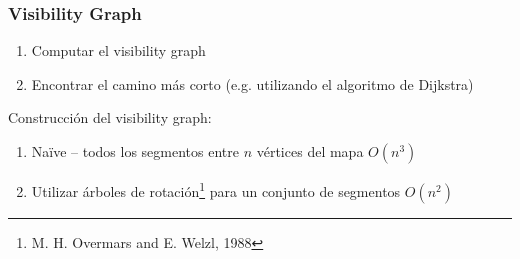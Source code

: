 \begin{frame}
	\frametitle{Visibility Graph}
	
	\begin{enumerate}
		\item Computar el visibility graph
		\item Encontrar el camino más corto (e.g. utilizando el algoritmo de Dijkstra)
	\end{enumerate}
	
	\begin{figure}
		\hspace{1em}
		\hspace{1em}
	\end{figure}

	Construcción del visibility graph:
	\begin{enumerate}
		\item Naïve -- todos los segmentos entre $n$ vértices del mapa $O(n^{3})$
		\item Utilizar árboles de rotación\footnote{M. H. Overmars and E. Welzl, 1988} para un conjunto de segmentos $O(n^{2})$
	\end{enumerate}
	
\end{frame}

